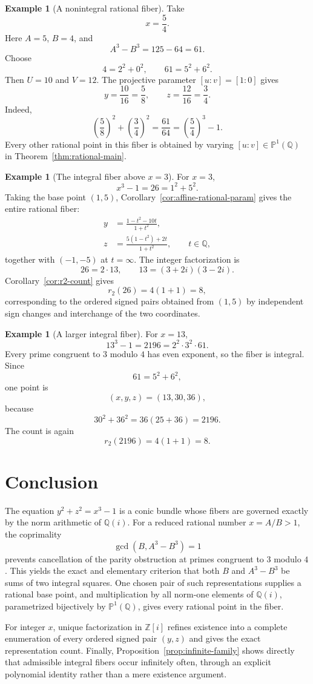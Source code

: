 \documentclass[11pt,a4paper]{article}
\numberwithin{equation}{section}
\theoremstyle{definition}
\newtheorem{example}[theorem]{Example}
\theoremstyle{remark}
\newcommand{\Z}{\mathbb Z}
\newcommand{\Q}{\mathbb Q}
\newcommand{\PP}{\mathbb P}
\begin{document}
\begin{example}[A nonintegral rational fiber]
Take
\[
 x=\frac54.
\]
Here $A=5$, $B=4$, and
\[
 A^3-B^3=125-64=61.
\]
Choose
\[
 4=2^2+0^2,
 \qquad
 61=5^2+6^2.
\]
Then $U=10$ and $V=12$. The projective parameter $[u:v]=[1:0]$ gives
\[
 y=\frac{10}{16}=\frac58,
 \qquad
 z=\frac{12}{16}=\frac34.
\]
Indeed,
\[
 \left(\frac58\right)^2+
 \left(\frac34\right)^2
 =\frac{61}{64}
 =\left(\frac54\right)^3-1.
\]
Every other rational point in this fiber is obtained by varying $[u:v]\in\PP^1(\Q)$ in Theorem~\ref{thm:rational-main}.
\end{example}

\begin{example}[The integral fiber above $x=3$]
For $x=3$,
\[
 x^3-1=26=1^2+5^2.
\]
Taking the base point $(1,5)$, Corollary~\ref{cor:affine-rational-param} gives the entire rational fiber:
\begin{align*}
 y&=\frac{1-t^2-10t}{1+t^2},\\
 z&=\frac{5(1-t^2)+2t}{1+t^2},
 \qquad t\in\Q,
\end{align*}
together with $(-1,-5)$ at $t=\infty$. The integer factorization is
\[
 26=2\cdot13,
 \qquad
 13=(3+2i)(3-2i).
\]
Corollary~\ref{cor:r2-count} gives
\[
 r_2(26)=4(1+1)=8,
\]
corresponding to the ordered signed pairs obtained from $(1,5)$ by independent sign changes and interchange of the two coordinates.
\end{example}

\begin{example}[A larger integral fiber]
For $x=13$,
\[
 13^3-1=2196=2^2\cdot3^2\cdot61.
\]
Every prime congruent to $3$ modulo $4$ has even exponent, so the fiber is integral. Since
\[
 61=5^2+6^2,
\]
one point is
\[
 (x,y,z)=(13,30,36),
\]
because
\[
 30^2+36^2=36(25+36)=2196.
\]
The count is again
\[
 r_2(2196)=4(1+1)=8.
\]
\end{example}

\section{Conclusion}

The equation $y^2+z^2=x^3-1$ is a conic bundle whose fibers are governed exactly by the norm arithmetic of $\Q(i)$. For a reduced rational number $x=A/B>1$, the coprimality
\[
 \gcd(B,A^3-B^3)=1
\]
prevents cancellation of the parity obstruction at primes congruent to $3$ modulo $4$. This yields the exact and elementary criterion that both $B$ and $A^3-B^3$ be sums of two integral squares. One chosen pair of such representations supplies a rational base point, and multiplication by all norm-one elements of $\Q(i)$, parametrized bijectively by $\PP^1(\Q)$, gives every rational point in the fiber.

For integer $x$, unique factorization in $\Z[i]$ refines existence into a complete enumeration of every ordered signed pair $(y,z)$ and gives the exact representation count. Finally, Proposition~\ref{prop:infinite-family} shows directly that admissible integral fibers occur infinitely often, through an explicit polynomial identity rather than a mere existence argument.
\end{document}
